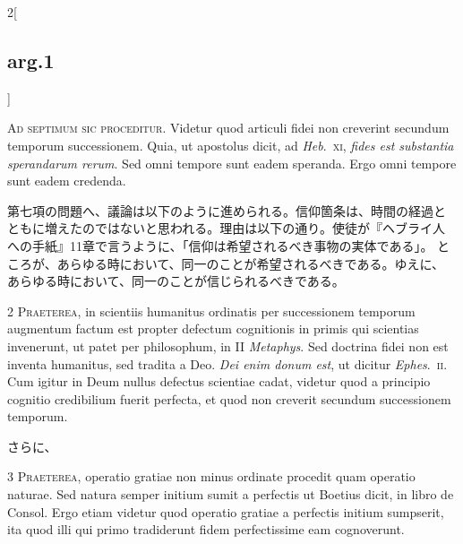 \documentclass[paper=a4paper,fontsize=10pt,jafontsize=9pt,titlepage]{jlreq}
\begin{document}
\begin{paracol}{2}[\subsection{arg.1}]

{\huge A}{\scshape d septimum sic proceditur}. Videtur
quod articuli fidei non creverint secundum temporum successionem. Quia,
ut apostolus dicit, ad {\itshape Heb}.~{\scshape xi}, {\itshape fides est substantia sperandarum
rerum}. Sed omni tempore sunt eadem speranda. Ergo omni tempore sunt
eadem credenda.

\switchcolumn

第七項の問題へ、議論は以下のように進められる。信仰箇条は、時間の経過と
ともに増えたのではないと思われる。理由は以下の通り。使徒が『ヘブライ人
への手紙』11章で言うように、「信仰は希望されるべき事物の実体である」。
ところが、あらゆる時において、同一のことが希望されるべきである。ゆえに、
あらゆる時において、同一のことが信じられるべきである。


{\scshape 2 Praeterea}, in scientiis humanitus ordinatis per
successionem temporum augmentum factum est propter defectum cognitionis
in primis qui scientias invenerunt, ut patet per philosophum, in II
{\itshape Metaphys}. Sed doctrina fidei non est inventa humanitus, sed
tradita a Deo. {\itshape Dei enim donum est}, ut dicitur {\itshape
Ephes}.~{\scshape ii}. Cum igitur in Deum nullus defectus scientiae
cadat, videtur quod a principio cognitio credibilium fuerit perfecta, et
quod non creverit secundum successionem temporum.

\switchcolumn

さらに、


{\scshape 3 Praeterea}, operatio gratiae non minus
ordinate procedit quam operatio naturae. Sed natura semper initium sumit
a perfectis ut Boetius dicit, in libro de Consol. Ergo etiam videtur
quod operatio gratiae a perfectis initium sumpserit, ita quod illi qui
primo tradiderunt fidem perfectissime eam cognoverunt.

\switchcolumn




\end{paracol}
\end{document}
